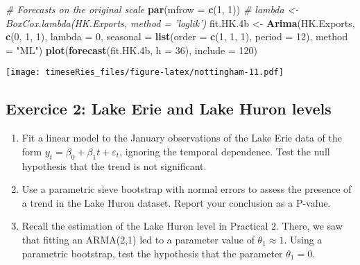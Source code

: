 \documentclass[]{book}
\newenvironment{Shaded}{\begin{snugshade}}{\end{snugshade}}
\newcommand{\CommentTok}[1]{\textcolor[rgb]{0.56,0.35,0.01}{\textit{#1}}}
\newcommand{\DataTypeTok}[1]{\textcolor[rgb]{0.13,0.29,0.53}{#1}}
\newcommand{\DecValTok}[1]{\textcolor[rgb]{0.00,0.00,0.81}{#1}}
\newcommand{\FloatTok}[1]{\textcolor[rgb]{0.00,0.00,0.81}{#1}}
\newcommand{\KeywordTok}[1]{\textcolor[rgb]{0.13,0.29,0.53}{\textbf{#1}}}
\newcommand{\NormalTok}[1]{#1}
\newcommand{\StringTok}[1]{\textcolor[rgb]{0.31,0.60,0.02}{#1}}
\providecommand{\tightlist}{%
  \setlength{\itemsep}{0pt}\setlength{\parskip}{0pt}}
\begin{document}
\begin{Shaded}
\begin{Highlighting}[]
\CommentTok{# Forecasts on the original scale}
\KeywordTok{par}\NormalTok{(}\DataTypeTok{mfrow =} \KeywordTok{c}\NormalTok{(}\DecValTok{1}\NormalTok{, }\DecValTok{1}\NormalTok{))}
\CommentTok{# lambda <- BoxCox.lambda(HK.Exports, method = 'loglik')}
\NormalTok{fit.HK}\FloatTok{.4}\NormalTok{b <-}\StringTok{ }\KeywordTok{Arima}\NormalTok{(HK.Exports, }\KeywordTok{c}\NormalTok{(}\DecValTok{0}\NormalTok{, }\DecValTok{1}\NormalTok{, }\DecValTok{1}\NormalTok{), }\DataTypeTok{lambda =} \DecValTok{0}\NormalTok{, }\DataTypeTok{seasonal =} \KeywordTok{list}\NormalTok{(}\DataTypeTok{order =} \KeywordTok{c}\NormalTok{(}\DecValTok{1}\NormalTok{, }
    \DecValTok{1}\NormalTok{, }\DecValTok{1}\NormalTok{), }\DataTypeTok{period =} \DecValTok{12}\NormalTok{), }\DataTypeTok{method =} \StringTok{"ML"}\NormalTok{)}
\KeywordTok{plot}\NormalTok{(}\KeywordTok{forecast}\NormalTok{(fit.HK}\FloatTok{.4}\NormalTok{b, }\DataTypeTok{h =} \DecValTok{36}\NormalTok{), }\DataTypeTok{include =} \DecValTok{120}\NormalTok{)}
\end{Highlighting}
\end{Shaded}

\texttt{[image: timeseRies\_files/figure-latex/nottingham-11.pdf]}

\hypertarget{exercice-2-lake-erie-and-lake-huron-levels-1}{%
\subsection{Exercice 2: Lake Erie and Lake Huron
levels}\label{exercice-2-lake-erie-and-lake-huron-levels-1}}

\begin{enumerate}
\def\labelenumi{\arabic{enumi}.}
\tightlist
\item
  Fit a linear model to the January observations of the Lake Erie data
  of the form \(y_t=\beta_0+\beta_1t+\varepsilon_t\), ignoring the
  temporal dependence. Test the null hypothesis that the trend is not
  significant.
\item
  Use a parametric sieve bootstrap with normal errors to assess the
  presence of a trend in the Lake Huron dataset. Report your conclusion
  as a P-value.
\item
  Recall the estimation of the Lake Huron level in Practical 2. There,
  we saw that fitting an ARMA(2,1) led to a parameter value of
  \(\theta_1 \approx 1\). Using a parametric bootstrap, test the
  hypothesis that the parameter \(\theta_1=0\).
\end{enumerate}
\end{document}
